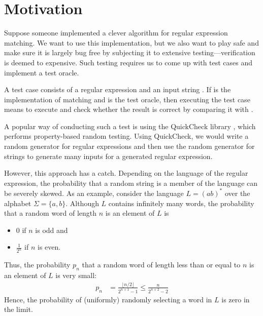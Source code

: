 \section{Motivation}
\label{sec:motivation}

Suppose someone implemented a clever algorithm for
regular expression matching. 
We want to use this implementation, but we also want to play safe and
make sure it is largely bug free by subjecting it to extensive
testing---verification is deemed to expensive.
Such testing requires us to come up with test cases and
implement a test oracle.


A test case consists of a regular expression  and an input
string . If  is the implementation of matching
and  is the test oracle, then
executing the test case means to execute  and check whether the result is correct by comparing it with
. 

A popular way of conducting such a test is using the QuickCheck library
\cite{DBLP:conf/icfp/ClaessenH00}, which performs property-based random testing. Using
QuickCheck, we would write a random generator for regular expressions
and then use the random generator for strings to generate many inputs for a
generated regular expression.

However, this approach has a
catch. Depending on the language of the regular expression, the
probability that a random string is a member of the language can be
severely skewed. As an example, consider the language $L = (ab)^*$ over the
alphabet $\Sigma = \{a, b\}$. Although $L$ contains infinitely many
words, the probability that a random word of
length $n$ is an element of $L$ is
\begin{itemize}
\item $0$ if $n$ is odd and
\item $\frac{1}{2^n}$ if $n$ is even.
\end{itemize}
Thus, the probability $p_n$ that a random word of length less than or equal to
$n$ is an element of $L$ is very small:
\begin{align*}
  p_n &= \frac{\lfloor n/2 \rfloor}{2^{n+1} - 1}
        \le \frac{n}{2^{n+2} - 2}
\end{align*}
Hence, the probability of (uniformly) randomly
selecting a word in $L$ is zero in the limit.

